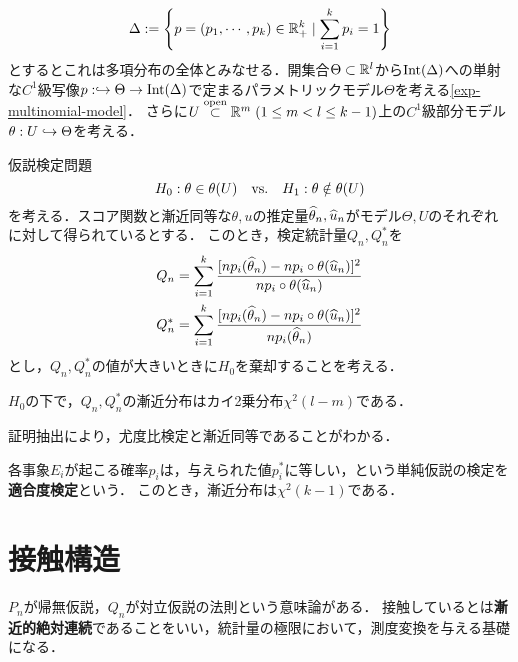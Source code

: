 \documentclass[uplatex,dvipdfmx]{jsreport}
\begin{document}
\begin{notation}[モデルの設定]
    \[\Delta:=\left\{p=(p_1,\cdots,p_k)\in\mathbb{R}_+^k\mid\sum^k_{i=1}p_i=1\right\}\]
    とするとこれは多項分布の全体とみなせる．開集合$\Theta\subset\mathbb{R}^l$から$\mathrm{Int}(\Delta)$への単射な$C^1$級写像$p:\hookrightarrow\Theta\to\mathrm{Int}(\Delta)$で定まるパラメトリックモデル$\Theta$を考える\ref{exp-multinomial-model}．
    さらに$U\overset{\mathrm{open}}{\subset}\mathbb{R}^m\;(1\le m<l\le k-1)$上の$C^1$級部分モデル$\theta:U\hookrightarrow\Theta$を考える．
\end{notation}

\begin{problem}
    仮説検定問題
    \[H_0:\theta\in\theta(U)\quad\mathrm{vs.}\quad H_1:\theta\notin\theta(U)\]
    を考える．スコア関数と漸近同等な$\theta,u$の推定量$\widehat{\theta}_n,\widehat{u}_n$がモデル$\Theta,U$のそれぞれに対して得られているとする．
    このとき，検定統計量$Q_n,Q_n^*$を
    \begin{align*}
        Q_n&=\sum^k_{i=1}\frac{[np_i(\widehat{\theta}_n)-np_i\circ\theta(\widehat{u}_n)]^2}{np_i\circ\theta(\widehat{u}_n)}\\
        Q_n^*&=\sum^k_{i=1}\frac{[np_i(\widehat{\theta}_n)-np_i\circ\theta(\widehat{u}_n)]^2}{np_i(\widehat{\theta}_n)}
    \end{align*}
    とし，$Q_n,Q_n^*$の値が大きいときに$H_0$を棄却することを考える．
\end{problem}

\begin{theorem}
    $H_0$の下で，$Q_n,Q_n^*$の漸近分布はカイ2乗分布$\chi^2(l-m)$である．
\end{theorem}
\begin{remarks}
    証明抽出により，尤度比検定と漸近同等であることがわかる．
\end{remarks}

\begin{example}
    各事象$E_i$が起こる確率$p_i$は，与えられた値$p^*_i$に等しい，という単純仮説の検定を\textbf{適合度検定}という．
    このとき，漸近分布は$\chi^2(k-1)$である．
\end{example}

\section{接触構造}

\begin{tcolorbox}[colframe=ForestGreen, colback=ForestGreen!10!white,breakable,colbacktitle=ForestGreen!40!white,coltitle=black,fonttitle=\bfseries\sffamily,
title=]
    $P_n$が帰無仮説，$Q_n$が対立仮説の法則という意味論がある．
    接触しているとは\textbf{漸近的絶対連続}であることをいい，統計量の極限において，測度変換を与える基礎になる．
\end{tcolorbox}
\end{document}
